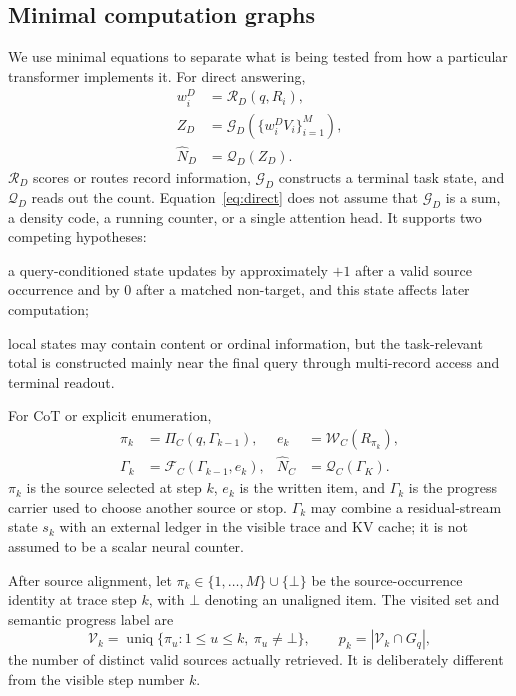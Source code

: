 \documentclass[10pt,twocolumn]{article}
\newcommand{\uniq}{\operatorname{uniq}}
\begin{document}
\subsection{Minimal computation graphs}
We use minimal equations to separate what is being tested from how a particular transformer
implements it. For direct answering,
\begin{equation}
\begin{aligned}
 w_i^D&=\mathcal R_D(q,R_i),\\
 Z_D&=\mathcal G_D\!\left(\{w_i^D V_i\}_{i=1}^{M}\right),\\
 \widehat N_D&=\mathcal Q_D(Z_D).
\end{aligned}
 \label{eq:direct}
\end{equation}
$\mathcal R_D$ scores or routes record information, $\mathcal G_D$ constructs a terminal
task state, and $\mathcal Q_D$ reads out the count. Equation~\eqref{eq:direct} does not assume
that $\mathcal G_D$ is a sum, a density code, a running counter, or a single attention head.
It supports two competing hypotheses:
\begin{description}[style=nextline]
  \item[$H_{\mathrm{run}}$:] a query-conditioned state updates by approximately $+1$ after a
  valid source occurrence and by $0$ after a matched non-target, and this state affects later
  computation;
  \item[$H_{\mathrm{agg}}$:] local states may contain content or ordinal information, but the
  task-relevant total is constructed mainly near the final query through multi-record access
  and terminal readout.
\end{description}

For CoT or explicit enumeration,
\begin{equation}
\begin{aligned}
 \pi_k&=\Pi_C(q,\Gamma_{k-1}),&
 e_k&=\mathcal W_C(R_{\pi_k}),\\
 \Gamma_k&=\mathcal F_C(\Gamma_{k-1},e_k),&
 \widehat N_C&=\mathcal Q_C(\Gamma_K).
\end{aligned}
\label{eq:cot}
\end{equation}
$\pi_k$ is the source selected at step $k$, $e_k$ is the written item, and $\Gamma_k$ is the
progress carrier used to choose another source or stop. $\Gamma_k$ may combine a residual-stream
state $s_k$ with an external ledger in the visible trace and KV cache; it is not assumed to be a
scalar neural counter.

After source alignment, let
$\pi_k\in\{1,\ldots,M\}\cup\{\bot\}$ be the source-occurrence identity at trace step $k$, with
$\bot$ denoting an unaligned item. The visited set and semantic progress label are
\begin{equation}
\mathcal V_k=\uniq\{\pi_u:1\leq u\leq k,\ \pi_u\neq\bot\},
\qquad p_k=|\mathcal V_k\cap G_q|,
\label{eq:progress}
\end{equation}
the number of distinct valid sources actually retrieved. It is deliberately different from the
visible step number $k$.
\end{document}

